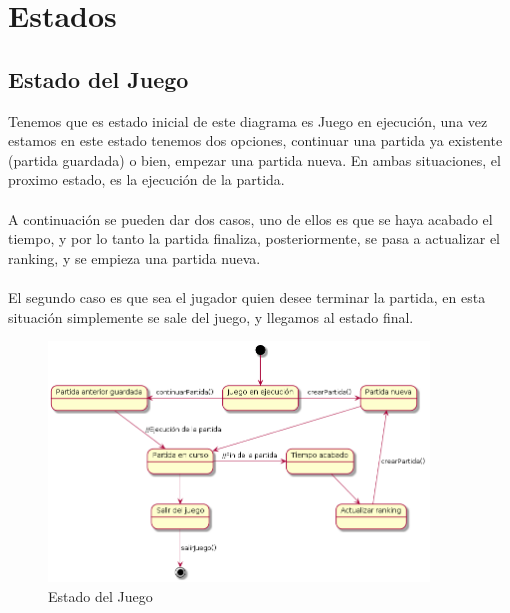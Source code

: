 \section{Estados}\label{sec:uc0}


\subsection{Estado del Juego}\label{sec:uc0}

Tenemos que es estado inicial de este diagrama es Juego en ejecución, una vez estamos en este estado tenemos dos opciones, continuar una partida ya existente (partida guardada) o bien, empezar una partida nueva. En ambas situaciones, el proximo estado, es la ejecución de la partida.
  \\
  \\A continuación se pueden dar dos casos, uno de ellos es que se haya acabado el tiempo, y por lo tanto la partida finaliza, posteriormente, se pasa a actualizar el ranking, y se empieza una partida nueva.
  \\
  \\El segundo caso es que sea el jugador quien desee terminar la partida, en esta situación simplemente se sale del juego, y llegamos al estado final.
  \\
  
 \begin{figure}[ht]
	\centering
	\includegraphics[width=0.9\textwidth]{./imatges/Estados_juego.png}
	\caption{Estado del Juego}
\end{figure} 


\newpage

